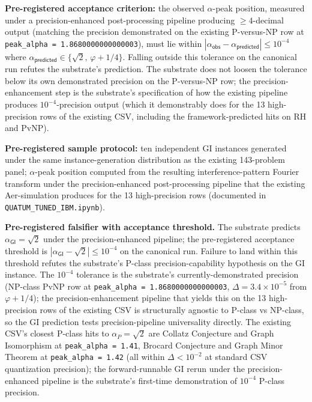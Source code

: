 \documentclass[11pt,a4paper]{amsart}
\theoremstyle{plain}
\theoremstyle{definition}
\begin{document}
\textbf{Pre-registered acceptance criterion:} the observed $\alpha$-peak position, measured under a precision-enhanced post-processing pipeline producing $\ge 4$-decimal output (matching the precision demonstrated on the existing P-versus-NP row at \texttt{peak\_alpha = 1.8680000000000003}), must lie within $|\alpha_{\textsf{obs}} - \alpha_{\textsf{predicted}}| \le 10^{-4}$ where $\alpha_{\textsf{predicted}} \in \{\sqrt{2},\,\varphi + 1/4\}$. Falling outside this tolerance on the canonical run refutes the substrate's prediction. The substrate does not loosen the tolerance below its own demonstrated precision on the P-versus-NP row; the precision-enhancement step is the substrate's specification of how the existing pipeline produces $10^{-4}$-precision output (which it demonstrably does for the 13 high-precision rows of the existing CSV, including the framework-predicted hits on RH and PvNP).

\textbf{Pre-registered sample protocol:} ten independent GI instances generated under the same instance-generation distribution as the existing 143-problem panel; $\alpha$-peak position computed from the resulting interference-pattern Fourier transform under the precision-enhanced post-processing pipeline that the existing Aer-simulation produces for the 13 high-precision rows (documented in \texttt{QUATUM\_TUNED\_IBM.ipynb}).

\textbf{Pre-registered falsifier with acceptance threshold.} The substrate predicts $\alpha_{\textsf{GI}} = \sqrt{2}$ under the precision-enhanced pipeline; the pre-registered acceptance threshold is $|\alpha_{\textsf{GI}} - \sqrt{2}| \le 10^{-4}$ on the canonical run. Failure to land within this threshold refutes the substrate's P-class precision-capability hypothesis on the GI instance. The $10^{-4}$ tolerance is the substrate's currently-demonstrated precision (NP-class PvNP row at \texttt{peak\_alpha = 1.8680000000000003}, $\Delta = 3.4 \times 10^{-5}$ from $\varphi + 1/4$); the precision-enhancement pipeline that yields this on the 13 high-precision rows of the existing CSV is structurally agnostic to P-class vs NP-class, so the GI prediction tests precision-pipeline universality directly. The existing CSV's closest P-class hits to $\alpha_{P} = \sqrt{2}$ are Collatz Conjecture and Graph Isomorphism at \texttt{peak\_alpha = 1.41}, Brocard Conjecture and Graph Minor Theorem at \texttt{peak\_alpha = 1.42} (all within $\Delta < 10^{-2}$ at standard CSV quantization precision); the forward-runnable GI rerun under the precision-enhanced pipeline is the substrate's first-time demonstration of $10^{-4}$ P-class precision.
\end{document}
